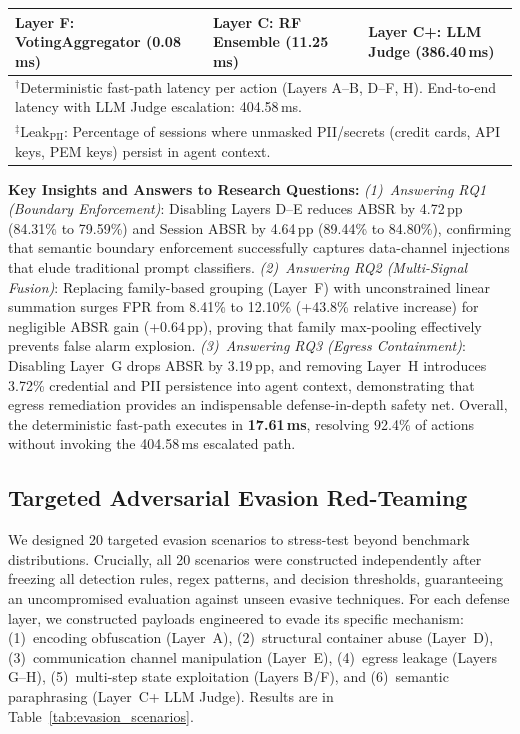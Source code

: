 \documentclass[runningheads]{llncs}
\begin{document}
\begin{table}[t]
{\begin{tabular}{lcccccc}
Layer F: VotingAggregator (0.08\,ms) & \multicolumn{3}{l}{Layer C: RF Ensemble (11.25\,ms)} & \multicolumn{3}{l}{Layer C+: LLM Judge (386.40\,ms)} \\
\bottomrule
\multicolumn{7}{l}{\footnotesize $^\dagger$Deterministic fast-path latency per action (Layers A--B, D--F, H). End-to-end latency with LLM Judge escalation: 404.58\,ms.} \\
\multicolumn{7}{l}{\footnotesize $^\ddagger$Leak$_{\text{PII}}$: Percentage of sessions where unmasked PII/secrets (credit cards, API keys, PEM keys) persist in agent context.}
\end{tabular}%
}
\end{table}

\noindent\textbf{Key Insights and Answers to Research Questions:}
\textit{(1)~Answering RQ1 (Boundary Enforcement)}: Disabling Layers D--E reduces ABSR by 4.72\,pp (84.31\% to 79.59\%) and Session ABSR by 4.64\,pp (89.44\% to 84.80\%), confirming that semantic boundary enforcement successfully captures data-channel injections that elude traditional prompt classifiers.
\textit{(2)~Answering RQ2 (Multi-Signal Fusion)}: Replacing family-based grouping (Layer~F) with unconstrained linear summation surges FPR from 8.41\% to 12.10\% (+43.8\% relative increase) for negligible ABSR gain (+0.64\,pp), proving that family max-pooling effectively prevents false alarm explosion.
\textit{(3)~Answering RQ3 (Egress Containment)}: Disabling Layer~G drops ABSR by 3.19\,pp, and removing Layer~H introduces 3.72\% credential and PII persistence into agent context, demonstrating that egress remediation provides an indispensable defense-in-depth safety net.
Overall, the deterministic fast-path executes in \textbf{17.61\,ms}, resolving 92.4\% of actions without invoking the 404.58\,ms escalated path.

\subsection{Targeted Adversarial Evasion Red-Teaming}
We designed 20 targeted evasion scenarios to stress-test beyond benchmark distributions. Crucially, all 20 scenarios were constructed independently after freezing all detection rules, regex patterns, and decision thresholds, guaranteeing an uncompromised evaluation against unseen evasive techniques. For each defense layer, we constructed payloads engineered to evade its specific mechanism: (1)~encoding obfuscation (Layer~A), (2)~structural container abuse (Layer~D), (3)~communication channel manipulation (Layer~E), (4)~egress leakage (Layers G--H), (5)~multi-step state exploitation (Layers B/F), and (6)~semantic paraphrasing (Layer~C+ LLM Judge). Results are in Table~\ref{tab:evasion_scenarios}.
\end{document}
